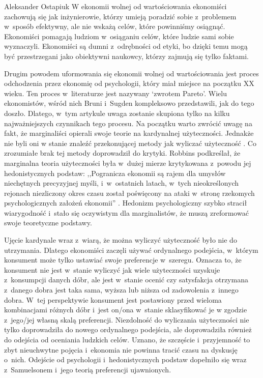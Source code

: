 \begin{artplenv}{Aleksander Ostapiuk}
W ekonomii wolnej od wartościowania ekonomiści zachowują się jak inżynierowie, którzy umieją poradzić sobie z~problemem
w~sposób efektywny, ale nie wskażą celów, które powinniśmy osiągnąć. Ekonomiści pomagają ludziom w~osiąganiu celów,
które ludzie sami sobie wyznaczyli. Ekonomiści są dumni z~odrębności od etyki, bo dzięki temu mogą być przestrzegani
jako obiektywni naukowcy, którzy zajmują się tylko faktami. 

Drugim powodem uformowania się ekonomii wolnej od wartościowania jest proces odchodzenia przez ekonomię od psychologii,
który miał miejsce na początku XX wieku. Ten proces w~literaturze jest nazywany `zwrotem Pareto'. Wielu ekonomistów,
wśród nich Bruni i~Sugden
\parencite*{bruni_road_2007}
kompleksowo przedstawili, jak do tego doszło. Dlatego, w~tym
artykule uwaga zostanie skupiona tylko na kilku najważniejszych czynnikach tego procesu. Na początku warto zwrócić
uwagę na fakt, że marginaliści opierali swoje teorie na kardynalnej użyteczności. Jednakże nie byli oni w
stanie znaleźć przekonującej metody jak wyliczać użyteczność
\parencite{stigler_development_1950}.
Co zrozumiałe
brak tej metody doprowadził do krytyki. Robbins podkreślał, że marginalna teoria użyteczności była w~dużej mierze
krytykowana z~powodu jej hedonistycznych podstaw: ,,Pogranicza ekonomii są rajem dla umysłów niechętnych precyzyjnej
myśli, i~w~ostatnich latach, w~tych nieokreślonych rejonach niezliczony okres czasu został poświęcony na ataki w~stronę
rzekomych psychologicznych założeń ekonomii''
\parencite[s.~83]{robbins_essay_1935}.
Hedonizm psychologiczny
szybko stracił wiarygodność i~stało się oczywistym dla marginalistów, że muszą zreformować swoje teoretyczne podstawy. 

Ujęcie kardynale wraz z~wiarą, że można wyliczyć użyteczność było nie do utrzymania. Dlatego ekonomiści zaczęli używać
ordynalnego podejścia, w~którym konsument może tylko ustawiać swoje preferencje w~szeregu. Oznacza to, że konsument nie
jest w~stanie wyliczyć jak wiele użyteczności uzyskuje z~konsumpcji danych dóbr, ale jest w~stanie ocenić czy
satysfakcja otrzymana z~danego dobra jest taka sama, wyższa lub niższa od zadowolenia z~innego dobra. W~tej
perspektywie konsument jest postawiony przed wieloma kombinacjami różnych dóbr i~jest on/ona w~stanie sklasyfikować je
w zgodzie z~jego/jej własną skalą preferencji. Niezdolność do wyliczania użyteczności nie tylko doprowadziła do nowego
ordynalnego podejścia, ale doprowadziła również do odejścia od oceniania ludzkich celów. Uznano, że
szczęście i~przyjemność to zbyt nieuchwytne pojęcia i~ekonomia nie powinna tracić czasu na dyskusję o~nich.
Odejście od psychologii i~hedonistycznych podstaw dopełniło się wraz z~Samuelsonem i~jego teorią preferencji ujawnionych. 


\end{artplenv}
